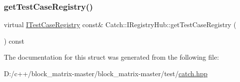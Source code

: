 \mbox{\label{struct_catch_1_1_i_registry_hub_af4f6255f0c0f8f1f179fa9d7d4843076}} 
\subsubsection{\texorpdfstring{get\+Test\+Case\+Registry()}{getTestCaseRegistry()}}
{\footnotesize\ttfamily virtual \mbox{\hyperlink{struct_catch_1_1_i_test_case_registry}{I\+Test\+Case\+Registry}} const\& Catch\+::\+I\+Registry\+Hub\+::get\+Test\+Case\+Registry (\begin{DoxyParamCaption}{ }\end{DoxyParamCaption}) const\hspace{0.3cm}{\ttfamily [pure virtual]}}



The documentation for this struct was generated from the following file\+:\begin{DoxyCompactItemize}
\item 
D\+:/c++/block\+\_\+matrix-\/master/block\+\_\+matrix-\/master/test/\mbox{\hyperlink{catch_8hpp}{catch.\+hpp}}\end{DoxyCompactItemize}
